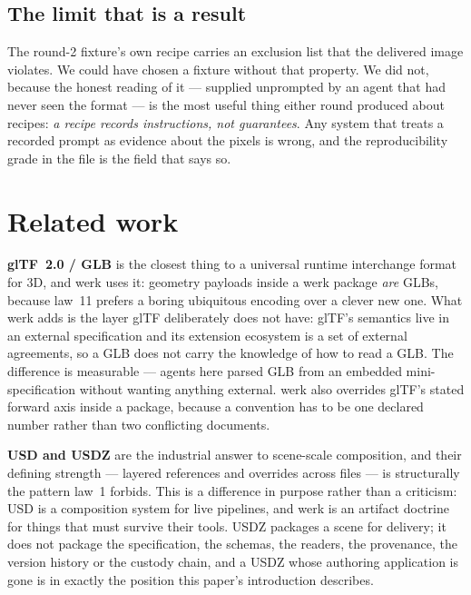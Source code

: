 \documentclass[10pt,twocolumn,letterpaper]{article}
\begin{document}
\subsection{The limit that is a result}

The round-2 fixture's own recipe carries an exclusion list that the delivered
image violates. We could have chosen a fixture without that property. We did not,
because the honest reading of it --- supplied unprompted by an agent that had never
seen the format --- is the most useful thing either round produced about recipes:
\emph{a recipe records instructions, not guarantees}. Any system that treats a
recorded prompt as evidence about the pixels is wrong, and the reproducibility
grade in the file is the field that says so.

\section{Related work}
\label{sec:related}

\textbf{glTF~2.0 / GLB} is the closest thing to a universal runtime interchange
format for 3D, and werk uses it: geometry payloads inside a werk package
\emph{are} GLBs, because law~11 prefers a boring ubiquitous encoding over a clever
new one. What werk adds is the layer glTF deliberately does not have: glTF's
semantics live in an external specification and its extension ecosystem is a set
of external agreements, so a GLB does not carry the knowledge of how to read a
GLB. The difference is measurable --- agents here parsed GLB from an embedded
mini-specification without wanting anything external. werk also overrides glTF's
stated forward axis inside a package, because a convention has to be one declared
number rather than two conflicting documents.

\textbf{USD and USDZ} are the industrial answer to scene-scale composition, and
their defining strength --- layered references and overrides across files --- is
structurally the pattern law~1 forbids. This is a difference in purpose rather than
a criticism: USD is a composition system for live pipelines, and werk is an
artifact doctrine for things that must survive their tools. USDZ packages a scene
for delivery; it does not package the specification, the schemas, the readers, the
provenance, the version history or the custody chain, and a USDZ whose authoring
application is gone is in exactly the position this paper's introduction describes.
\end{document}
